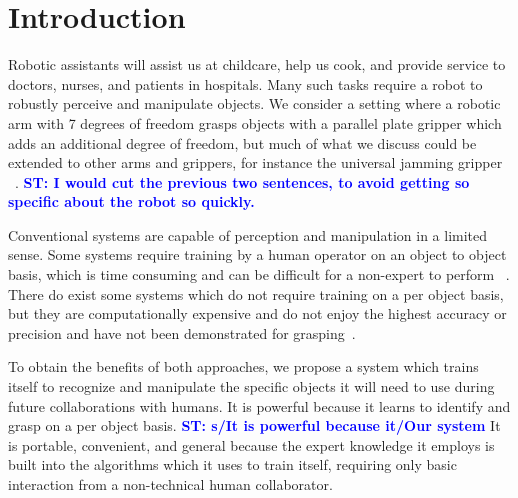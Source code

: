 \documentclass[conference]{IEEEtran}
\newcommand{\stnote}[1]{\textcolor{Blue}{\textbf{ST: #1}}}
\begin{document}

\section{Introduction}
Robotic assistants will assist us at childcare, help us cook, and provide service to
doctors, nurses, and patients in hospitals. Many such tasks require a robot to
robustly perceive and manipulate objects. We consider a setting where a robotic arm
with 7 degrees of freedom grasps objects with a parallel plate gripper which adds
an additional degree of freedom, but much of what we discuss could be extended to other
arms and grippers, for instance the universal jamming gripper ~\citep{}.
\stnote{I would cut the previous two sentences, to avoid getting so specific about the robot so quickly.  }

Conventional systems are capable of perception and manipulation in a limited sense.
Some systems require training by a human operator on an object to object basis, which 
is time consuming and can be difficult for a non-expert to perform ~\citep{ork14, lai11, lai11a}. There 
do exist some systems which
do not require training on a per object basis, but they are computationally expensive and do not enjoy the
highest accuracy or precision and have not been demonstrated for grasping~\citep{guadarrama14}.

To obtain the benefits of both approaches, we propose a system which trains itself 
to recognize and manipulate the specific objects it will need to use during future
collaborations with humans. It is powerful because it learns to identify and grasp on 
a per object basis. \stnote{s/It is powerful because it/Our system} It is portable, convenient, and general because the expert knowledge it employs
is built into the algorithms which it uses to train itself, requiring only basic
interaction from a non-technical human collaborator.
\end{document}
